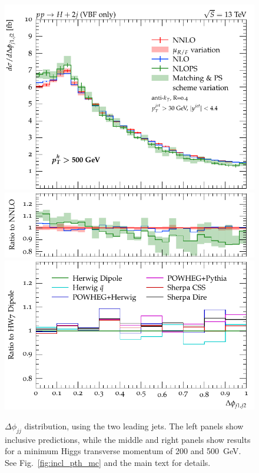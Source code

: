 \documentclass[10pt,prd,fleqn,superscriptaddress,notitlepage,nofootinbib,preprintnumbers,nobalancelastpage]{revtex4-1}
\begin{document}
\begin{figure}[tp]
\begin{minipage}{.32\textwidth}
    \includegraphics[width=\textwidth]{figures/tools/delta_phi_jj12_pth500.pdf}
    \includegraphics[width=\textwidth]{figures/tools/delta_phi_jj12_pth500_rFO.pdf}
    \includegraphics[width=\textwidth]{figures/tools/delta_phi_jj12_pth500_rMC.pdf}
  \end{minipage}
\caption{$\Delta \phi_{jj}$ distribution, using the two leading jets.
The left panels show inclusive predictions, while the middle and right panels
show results for a minimum Higgs transverse momentum of 200 and 500~GeV.
See Fig.~\ref{fig:incl_pth_mc} and the main text for details.}
\label{fig:incl_delta_phi_jj12_mc}
\end{figure}
\end{document}
